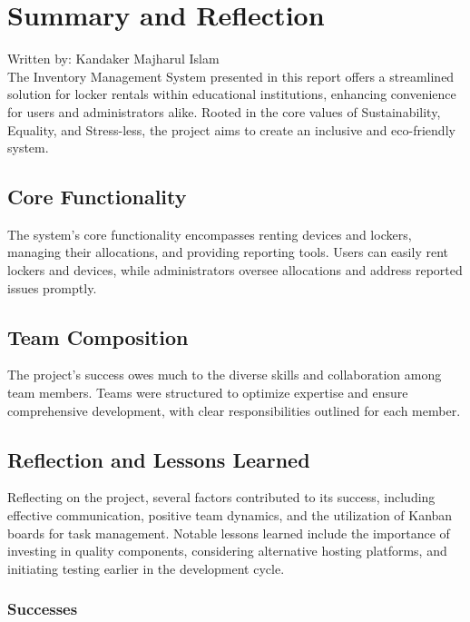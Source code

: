 \section{Summary and Reflection}
{\tiny Written by: Kandaker Majharul Islam}\\

The Inventory Management System presented in this report offers a streamlined solution for locker rentals within educational institutions, enhancing convenience for users and administrators alike. Rooted in the core values of Sustainability, Equality, and Stress-less, the project aims to create an inclusive and eco-friendly system.

\subsection{Core Functionality}

The system's core functionality encompasses renting devices and lockers, managing their allocations, and providing reporting tools. Users can easily rent lockers and devices, while administrators oversee allocations and address reported issues promptly.

\subsection{Team Composition}

The project's success owes much to the diverse skills and collaboration among team members. Teams were structured to optimize expertise and ensure comprehensive development, with clear responsibilities outlined for each member.

\subsection{Reflection and Lessons Learned}

Reflecting on the project, several factors contributed to its success, including effective communication, positive team dynamics, and the utilization of Kanban boards for task management. Notable lessons learned include the importance of investing in quality components, considering alternative hosting platforms, and initiating testing earlier in the development cycle.

\subsubsection{Successes}

